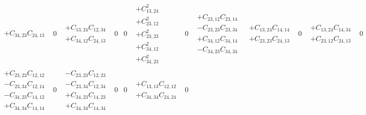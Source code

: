 \documentclass[pra,nofootinbib]{revtex4-1}
\newcommand{\C}[2]{C_{{#1},{#2}}}
\begin{document}
\begin{eqnarray}
\begin{array}{cccccccccccccccc}
\begin{array}{c}
     + \C{34}{23}\C{24}{13}
     \end{array} &
     0 &
     \begin{array}{c}
     + \C{13}{24}\C{12}{34} \\
     + \C{34}{12}\C{24}{13}
     \end{array} &
     0 &
     0 &
     \begin{array}{c}
     + \C{13}{24}^2 \\
     + \C{23}{12}^2 \\
     + \C{23}{23}^2 \\
     + \C{34}{12}^2 \\
     + \C{34}{23}^2
     \end{array} &
     0 &
     \begin{array}{c}
     + \C{23}{12}\C{23}{14} \\
     - \C{23}{23}\C{23}{34} \\
     + \C{34}{12}\C{34}{14} \\
     - \C{34}{23}\C{34}{34}
     \end{array} &
     \begin{array}{c}
     + \C{13}{24}\C{14}{14} \\
     + \C{23}{23}\C{24}{13}
     \end{array} &
     0 &
     \begin{array}{c}
     + \C{13}{24}\C{14}{34} \\
     + \C{23}{12}\C{24}{13}
     \end{array} &
     0 \\
     \begin{array}{c}
     + \C{23}{23}\C{12}{12} \\
     - \C{23}{34}\C{12}{14} \\
     - \C{34}{23}\C{14}{12} \\
     + \C{34}{34}\C{14}{14}
     \end{array} &
     0 &
     \begin{array}{c}
     - \C{23}{23}\C{12}{23} \\
     - \C{23}{34}\C{12}{34} \\
     + \C{34}{23}\C{14}{23} \\
     + \C{34}{34}\C{14}{34}
     \end{array} &
     0 &
     0 &
     \begin{array}{c}
     + \C{13}{13}\C{12}{12} \\
     + \C{34}{34}\C{24}{24}
     \end{array} &
     0 &
     \begin{array}{c}

\end{array}
\end{array}
\end{eqnarray}
\end{document}
